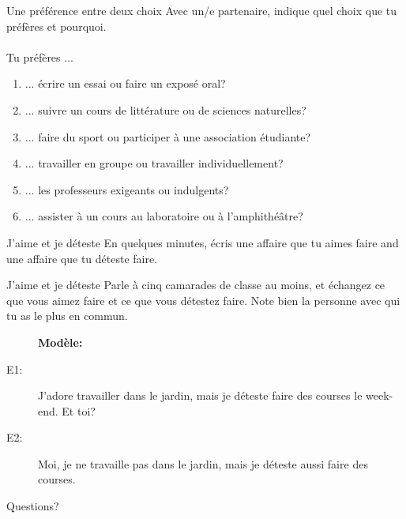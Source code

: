 \documentclass{beamer}
\begin{document}
  \begin{frame}{Une préférence entre deux choix}
    Avec un/e partenaire, indique quel choix que tu préfères et pourquoi. \\
     \\
    \vspace{1cm}
    Tu préfères ...
    \begin{enumerate}
      \item ... écrire un essai ou faire un exposé oral?
      \item ... suivre un cours de littérature ou de sciences naturelles?
      \item ... faire du sport ou participer à une association étudiante?
      \item ... travailler en groupe ou travailler individuellement?
      \item ... les professeurs exigeants  ou indulgents?
      \item ... assister à un cours au laboratoire ou à l'amphithéâtre?
    \end{enumerate}
  \end{frame}

  \begin{frame}{J'aime et je déteste}
    En quelques minutes, écris une affaire que tu aimes faire and une affaire que tu déteste faire. \\
  \end{frame}

  \begin{frame}{J'aime et je déteste}
    Parle à cinq camarades de classe au moins, et échangez ce que vous aimez faire et ce que vous détestez faire.
    Note bien la personne avec qui tu as le plus en commun. \\
    \begin{center}
      \begin{description}
        \item[] \textbf{Modèle:}
        \item[E1:] J'adore travailler dans le jardin, mais je déteste faire des courses le week-end. Et toi?
        \item[E2:] Moi, je ne travaille pas dans le jardin, mais je déteste aussi faire des courses.
      \end{description}
    \end{center}
  \end{frame}

  \begin{frame}{}
    \begin{center}
      \Large Questions?
    \end{center}
  \end{frame}
\end{document}
